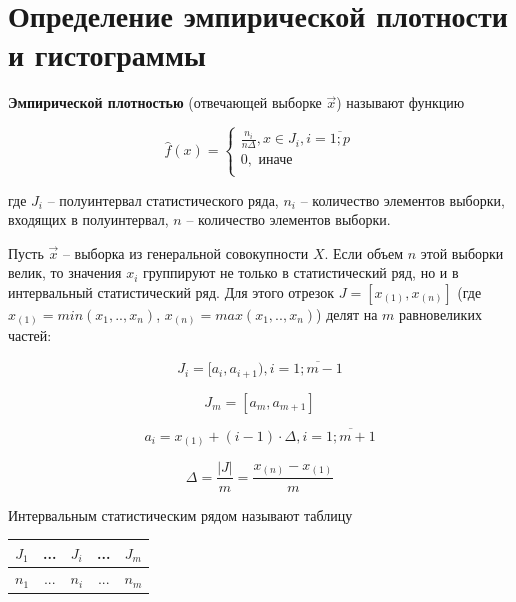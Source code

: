 \documentclass[12pt]{report}
\begin{document}
\section*{Определение эмпирической плотности и гистограммы}

\hfill 

    \textbf{Эмпирической плотностью} (отвечающей выборке $\vec x$) называют функцию

    \begin{equation*}
        \hat f(x) =
        \begin{cases}
            \frac{n_i}{n \Delta}, x \in J_i, i = \overline{1; p} \\
            0, \text{ иначе} \\
        \end{cases}
    \end{equation*}

где $J_i$ -- полуинтервал статистического ряда, $n_i$ -- количество элементов выборки, входящих в полуинтервал, $n$ -- количество элементов выборки.

\hfill

Пусть $\vec x$ -- выборка из генеральной совокупности $X$. Если объем $n$ этой выборки велик, то значения $x_i$ группируют не только в статистический ряд, но и в интервальный статистический ряд. Для этого отрезок
$J = [x_{(1)}, x_{(n)}]$ (где $x_{(1)}=min(x_1,..,x_n)$, $x_{(n)}=max(x_1,..,x_n)$) делят на $m$ равновеликих частей:

\begin{equation*}
    J_i = [a_i, a_{i+1}), i = \overline{1; m - 1}
\end{equation*}

\begin{equation*}
    J_{m} = [a_{m}, a_{m+1}]
\end{equation*}

$$a_i = x_{(1)} + (i-1)\cdot\Delta, i = \overline{1;m+1}$$

$$\Delta = \frac{|J|}{m} = \frac{x_{(n)} - x_{(1)}}{m}$$

    Интервальным статистическим рядом называют таблицу

    \begin{table}[H]
        \centering
        \begin{tabular}{|c|c|c|c|c|}
            \hline
            $J_1$ & ... & $J_i$ & ... & $J_m$ \\
            \hline
            $n_1$ & ... & $n_i$ & ... & $n_m$ \\
            \hline
        \end{tabular}
    \end{table}
\end{document}
